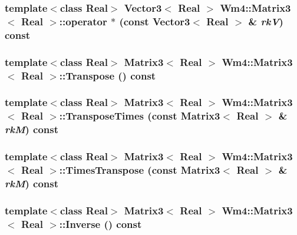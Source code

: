 \subsubsection{\setlength{\rightskip}{0pt plus 5cm}template$<$class Real$>$ {\bf Vector3}$<$ Real $>$ {\bf Wm4::Matrix3}$<$ Real $>$::operator $\ast$ (const {\bf Vector3}$<$ Real $>$ \& {\em rk\-V}) const\hspace{0.3cm}{\tt  [inline]}}\label{classWm4_1_1Matrix3_e3008eeadf23b72a2e7b7859b1f57371}


\subsubsection{\setlength{\rightskip}{0pt plus 5cm}template$<$class Real$>$ {\bf Matrix3}$<$ Real $>$ {\bf Wm4::Matrix3}$<$ Real $>$::Transpose () const}\label{classWm4_1_1Matrix3_03b9b38f9495e49113cfd1f317dd3149}


\subsubsection{\setlength{\rightskip}{0pt plus 5cm}template$<$class Real$>$ {\bf Matrix3}$<$ Real $>$ {\bf Wm4::Matrix3}$<$ Real $>$::Transpose\-Times (const {\bf Matrix3}$<$ Real $>$ \& {\em rk\-M}) const}\label{classWm4_1_1Matrix3_569769c48183a867172c9b0f5016cac7}


\subsubsection{\setlength{\rightskip}{0pt plus 5cm}template$<$class Real$>$ {\bf Matrix3}$<$ Real $>$ {\bf Wm4::Matrix3}$<$ Real $>$::Times\-Transpose (const {\bf Matrix3}$<$ Real $>$ \& {\em rk\-M}) const}\label{classWm4_1_1Matrix3_2ebdd8788b5c5b31a875c78940ef3935}


\subsubsection{\setlength{\rightskip}{0pt plus 5cm}template$<$class Real$>$ {\bf Matrix3}$<$ Real $>$ {\bf Wm4::Matrix3}$<$ Real $>$::Inverse () const}\label{classWm4_1_1Matrix3_1792108ddbbd08af04fa3f4fe6744feb}


